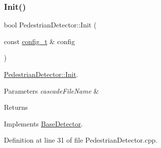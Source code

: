 \subsubsection{\texorpdfstring{Init()}{Init()}}
{\footnotesize\ttfamily bool Pedestrian\+Detector\+::\+Init (\begin{DoxyParamCaption}\item[{const \mbox{\hyperlink{defines_8h_a81d657237a541d02f8eeefdd40191920}{config\+\_\+t}} \&}]{config }\end{DoxyParamCaption})\hspace{0.3cm}{\ttfamily [virtual]}}



\mbox{\hyperlink{class_pedestrian_detector_a630d8ad4d8ca2123639e989b01c8dd3e}{Pedestrian\+Detector\+::\+Init}}. 


\begin{DoxyParams}{Parameters}
{\em cascade\+File\+Name} & \\
\hline
\end{DoxyParams}
\begin{DoxyReturn}{Returns}

\end{DoxyReturn}


Implements \mbox{\hyperlink{class_base_detector_a44c53608e9e4e3455ff553d987165260}{Base\+Detector}}.



Definition at line 31 of file Pedestrian\+Detector.\+cpp.



